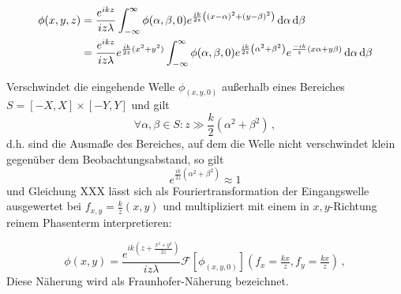 \begin{align}
\phi(x,y, z)&=\frac{e^{ikz}}{iz\lambda}
\int_{-\infty}^\infty 
\phi(\alpha,\beta,0)
e^{\frac{ik}{2z}\left(\left(x-\alpha\right)^2+\left(y-\beta\right)^2\right)}
\dif \alpha \dif \beta \nonumber \\
&=\frac{e^{ikz}}{iz\lambda}e^{\frac{ik}{2z}(x^2+y^2)}
\int_{-\infty}^\infty 
\phi(\alpha,\beta,0)
e^{\frac{ik}{2z}\left(\alpha^2+\beta^2\right)}
e^{\frac{-ik}{ z}\left(x\alpha+y\beta\right)}
\dif \alpha \dif \beta
\end{align}



Verschwindet die eingehende Welle $\phi_(x,y,0)$ außerhalb eines Bereiches $S=[-X,X]\times[-Y,Y]$ und gilt 
\begin{equation}
\forall \alpha,\beta \in S:	z\gg \frac{k}{2}\left(\alpha^2+\beta^2\right) \, , 
\end{equation}
d.h. sind die Ausmaße des Bereiches, auf dem die Welle nicht verschwindet klein gegenüber dem Beobachtungsabstand, so gilt
\begin{equation}
e^{\frac{ik}{2z}\left(\alpha^2+\beta^2\right)}\approx 1
\end{equation}
und Gleichung XXX lässt sich als Fouriertransformation der Eingangswelle ausgewertet bei $f_{x,y}=\tfrac{k}{z}(x,y)$ und multipliziert mit einem in $x,y$-Richtung reinem Phasenterm interpretieren:

\begin{equation}
\phi(x,y)=\frac{e^{ik(z+\frac{x^2+y^2}{2z})}}{iz\lambda}\mathscr{F}\left[\phi_(x,y,0)\right](f_x=\tfrac{kx}{z},f_y=\tfrac{kx}{z}) \, ,
\end{equation}
Diese Näherung wird als Fraunhofer-Näherung bezeichnet.

